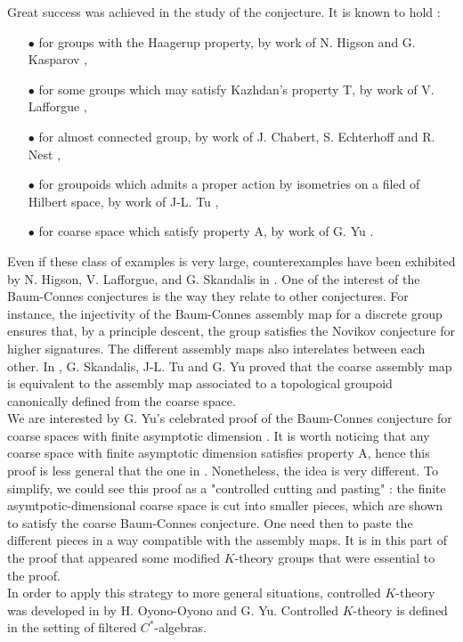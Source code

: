 Great success was achieved in the study of the conjecture. It is known to hold :
\begin{itemize}
\item[$\bullet$] for groups with the Haagerup property, by work of N. Higson and G. Kasparov \cite{higsonkasparov},
\item[$\bullet$] for some groups which may satisfy Kazhdan's property T, by work of V. Lafforgue \cite{Lafforgue}, 
\item[$\bullet$] for almost connected group, by work of J. Chabert, S. Echterhoff and R. Nest \cite{chabertEN},
\item[$\bullet$] for groupoids which admits a proper action by isometries on a filed of Hilbert space, by work of J-L. Tu \cite{TuThese},
\item[$\bullet$] for coarse space which satisfy property A, by work of G. Yu \cite{Yu2}.
\end{itemize}  
Even if these class of examples is very large, counterexamples have been exhibited by N. Higson, V. Lafforgue, and G. Skandalis in \cite{HigsonLaffSk}. One of the interest of the Baum-Connes conjectures is the way they relate to other conjectures. For instance, the injectivity of the Baum-Connes assembly map for a discrete group ensures that, by a principle descent, the group satisfies the Novikov conjecture for higher signatures. The different assembly maps also interelates between each other. In \cite{SkTuYu}, G. Skandalis, J-L. Tu and G. Yu proved that the coarse assembly map is equivalent to the assembly map associated to a topological groupoid canonically defined from the coarse space. \\

We are interested by G. Yu's celebrated proof of the Baum-Connes conjecture for coarse spaces with finite asymptotic dimension \cite{Yu1}. It is worth noticing that any coarse space with finite asymptotic dimension satisfies property A, hence this proof is less general that the one in \cite{Yu2}. Nonetheless, the idea is very different. To simplify, we could see this proof as a "controlled cutting and pasting" : the finite asymtpotic-dimensional coarse space is cut into smaller pieces, which are shown to satisfy the coarse Baum-Connes conjecture. One need then to paste the different pieces in a way compatible with the assembly maps. It is in this part of the proof that appeared some modified $K$-theory groups that were essential to the proof. \\

In order to apply this strategy to more general situations, controlled $K$-theory was developed in \cite{OY2} by H. Oyono-Oyono and G. Yu. Controlled $K$-theory is defined in the setting of filtered $C^*$-algebras. 
